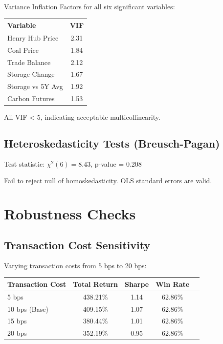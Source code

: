 \documentclass[12pt,a4paper]{article}
\begin{document}
Variance Inflation Factors for all six significant variables:

\begin{table}[H]
\centering
\begin{tabular}{@{}lc@{}}
\toprule
\textbf{Variable} & \textbf{VIF} \\
\midrule
Henry Hub Price & 2.31 \\
Coal Price & 1.84 \\
Trade Balance & 2.12 \\
Storage Change & 1.67 \\
Storage vs 5Y Avg & 1.92 \\
Carbon Futures & 1.53 \\
\bottomrule
\end{tabular}
\end{table}

All VIF < 5, indicating acceptable multicollinearity.

\subsection{Heteroskedasticity Tests (Breusch-Pagan)}

Test statistic: $\chi^2(6) = 8.43$, p-value = 0.208

Fail to reject null of homoskedasticity. OLS standard errors are valid.

\section{Robustness Checks}

\subsection{Transaction Cost Sensitivity}

Varying transaction costs from 5 bps to 20 bps:

\begin{table}[H]
\centering
\begin{tabular}{@{}lcccc@{}}
\toprule
\textbf{Transaction Cost} & \textbf{Total Return} & \textbf{Sharpe} & \textbf{Win Rate} \\
\midrule
5 bps & 438.21\% & 1.14 & 62.86\% \\
10 bps (Base) & 409.15\% & 1.07 & 62.86\% \\
15 bps & 380.44\% & 1.01 & 62.86\% \\
20 bps & 352.19\% & 0.95 & 62.86\% \\
\bottomrule
\end{tabular}
\end{table}
\end{document}

